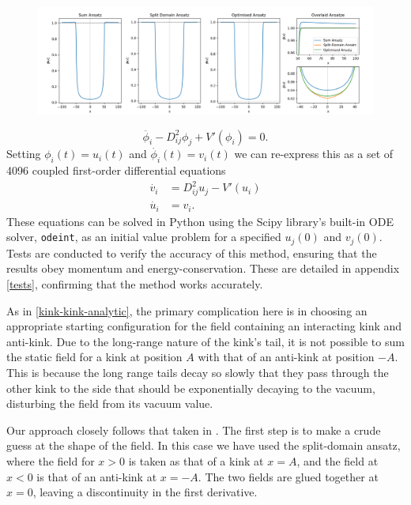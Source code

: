 \documentclass[11pt, oneside]{article}  	%
\numberwithin{equation}{section}
\begin{document}
\begin{figure}
\centering
\includegraphics[width=\textwidth]{field_ansatze.png}
\label{ansatze}
\end{figure}
\begin{equation}
\ddot{\phi_i} - D^2_{ij}\phi_j + V'(\phi_i) = 0.
\end{equation}
Setting $\phi_i(t) = u_i(t)$ and $\dot{\phi_i}(t) = v_i(t)$ we can re-express this as a set of 4096 coupled first-order differential equations
\begin{align}
\dot{v_i} &= D^2_{ij}u_j - V'(u_i) \\
\dot{u_i} &= v_i .
\end{align}
 These equations can be solved in Python using the Scipy library's built-in ODE solver, \texttt{odeint}, as an initial value problem for a specified $u_{j}(0)$ and $v_{j}(0)$. Tests are conducted to verify the accuracy of this method, ensuring that the results obey momentum and energy-conservation. These are detailed in appendix \ref{tests}, confirming that the method works accurately.\par
 As in \textsection \ref{kink-kink-analytic}, the primary complication here is in choosing an appropriate starting configuration for the field containing an interacting kink and anti-kink. Due to the long-range nature of the kink's tail, it is not possible to sum the static field for a kink at position $A$ with that of an anti-kink at position $-A$. This is because the long range tails decay so slowly that they pass through the other kink to the side that should be exponentially decaying to the vacuum, disturbing the field from its vacuum value.\par
 Our approach closely follows that taken in \cite{christov-num}. The first step is to make a crude guess at the shape of the field. In this case we have used the split-domain ansatz, where the field for $x>0$ is taken as that of a kink at $x=A$, and the field at $x<0$ is that of an anti-kink at $x=-A$. The two fields are glued together at $x=0$, leaving a discontinuity in the first derivative.\par
\end{document}
